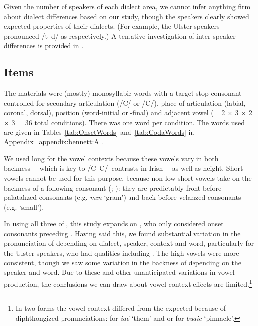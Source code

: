 \documentclass[output=paper,colorlinks,citecolor=brown]{langscibook}
\newcommand{\pal}{\ipa{ʲ}}
\newcommand{\vel}{\ipa{ˠ}}
\newcommand{\palvelcon}{/C\vel\ C\pal/}
\begin{document}
Given the number of speakers of each dialect area, we cannot infer anything firm about dialect differences based on our study, though the speakers clearly showed expected properties of their dialects. (For example, the Ulster speakers pronounced /t\pal\ d\pal/ as \ipa{[t͡ɕ d͡ʑ]} respectively.) A tentative investigation of inter-speaker differences is provided in .

\subsection{Items}\label{sec:items}
The materials were (mostly) monosyllabic words with a target stop consonant controlled for secondary articulation (/C\pal/ or /C\vel/), place of articulation (labial, coronal, dorsal), position (word-initial or -final) and adjacent vowel  (= 2 $\times$ 3 $\times$ 2 $\times$ 3 = 36 total conditions). There was one word per condition. The words used are given in Tables~\ref{tab:OnsetWords} and~\ref{tab:CodaWords} in Appendix~\ref{appendix:bennett:A}.

We used long  for the vowel contexts because these vowels vary in both backness~-- which is key to \palvelcon\ contrasts in Irish~-- as well as height. Short vowels cannot be used for this purpose, because non-low short vowels take on the backness of a following consonant (\citealt{NiChiosain_1991_diss}; \cite{ModernIrish}): they are predictably front before palatalized consonants (e.g. \emph{min} \ipa{[m\pal \uline{\textbf i}n\pal]} `grain') and back before velarized consonants (e.g. \ipa{[m\pal \uline{\textbf u}n\vel]} `small').

In using all three of , this study expands on \citet{Bennett_etal2018_Conamara_ultrasound}, who only considered onset consonants preceding . Having said this, we found substantial variation in the pronunciation of  depending on dialect, speaker, context and word, particularly for the Ulster speakers, who had qualities including \ipa{[ɔ a ɑ ʌ ɛ]}. The high vowels were more consistent, though we saw some variation in the backness of  depending on the speaker and word. Due to these and other unanticipated variations in vowel production, the conclusions we can draw about vowel context effects are limited.\footnote{In two forms the vowel context differed from the expected because of diphthongized pronunciations: \ipa{[iːəd\vel]} for \textit{iad} `them' and \ipa{[b\vel uːɨk\pal]} or \ipa{[b\vel uːɪk\pal]} for \textit{buaic} `pinnacle'.}
\end{document}
